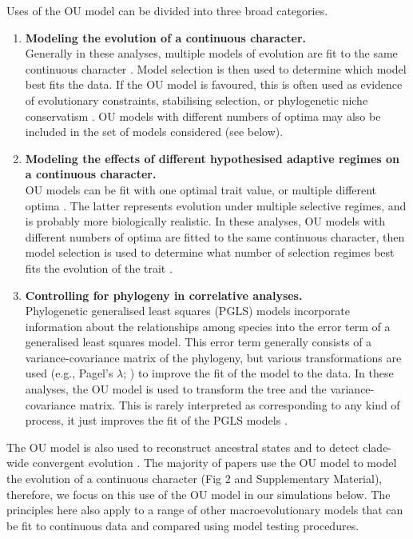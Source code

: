 \documentclass[a4paper,12pt]{article}
\begin{document}
  Uses of the OU model can be divided into three broad categories. %
    \begin{enumerate}
      \item \textbf{Modeling the evolution of a continuous character.}\\ 
            Generally in these analyses, multiple models of evolution are fit to the same continuous character \citep[e.g.,][]{Harmon:2010aa}. Model selection is then used to determine which model best fits the data. 
            If the OU model is favoured, this is often used as evidence of evolutionary constraints, stabilising selection, or phylogenetic niche conservatism \citep[e.g.,][]{Harmon:2010aa,cooper2010body,Wiens:2010aa,christin2013anatomical}.
            OU models with different numbers of optima may also be included in the set of models considered (see below).
      \item \textbf{Modeling the effects of different hypothesised adaptive regimes on a continuous character.}\\
            OU models can be fit with one optimal trait value, or multiple different optima \citep{Butler:2004aa}. 
            The latter represents evolution under multiple selective regimes, and is probably more biologically realistic. 
            In these analyses, OU models with different numbers of optima are fitted to the same continuous character, then model selection is used to determine what number of selection regimes best fits the evolution of the trait \citep[e.g.,][]{beaulieu2012modeling}.
      \item \textbf{Controlling for phylogeny in correlative analyses.}\\ 
            Phylogenetic generalised least squares (PGLS) models incorporate information about the relationships among species into the error term of a generalised least squares model. 
            This error term generally consists of a variance-covariance matrix of the phylogeny, but various transformations are used (e.g., Pagel's $\lambda$; \citealp{Pagel:1997aa}) to improve the fit of the model to the data. 
            In these analyses, the OU model is used to transform the tree and the variance-covariance matrix.
            This is rarely interpreted as corresponding to any kind of process, it just improves the fit of the PGLS models \citep[e.g.,][]{blankers2012ecological}.
    \end{enumerate}

  \noindent
  The OU model is also used to reconstruct ancestral states \citep{martins1999estimation}
  and to detect clade-wide convergent evolution \citep{ingram2013surface}. 
  The majority of papers use the OU model to model the evolution of a continuous character (Fig 2 and Supplementary Material), %
  therefore, we focus on this use of the OU model in our simulations below. 
  The principles here also apply to a range of other macroevolutionary models that can be fit to continuous data and compared using model testing procedures.
\end{document}

